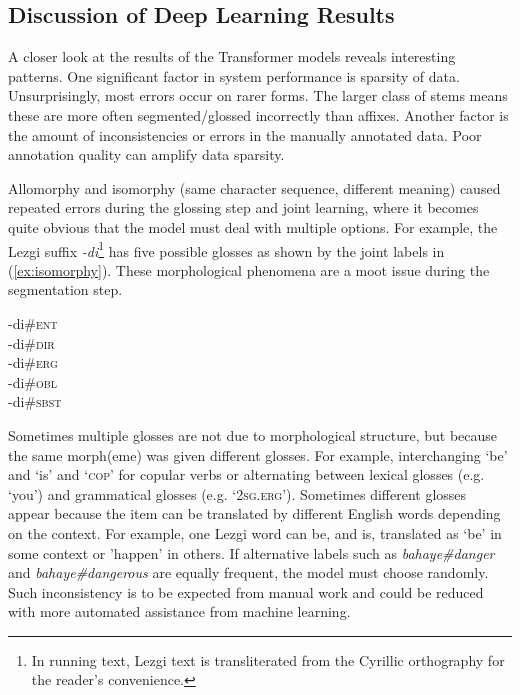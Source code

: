 \subsection{Discussion of Deep Learning Results}
\label{sec:sgDLanalysis}

A closer look at the results of the Transformer models reveals interesting patterns. One significant factor in system performance is sparsity of data. Unsurprisingly, most errors occur on rarer forms. The larger class of stems means these are more often segmented/glossed incorrectly than affixes. Another factor is the amount of inconsistencies or errors in the manually annotated data. Poor annotation quality can amplify data sparsity. 

Allomorphy and isomorphy (same character sequence, different meaning) caused repeated errors during the glossing step and joint learning, where it becomes quite obvious that the model must deal with multiple options. For example, the Lezgi suffix \textit{-di}\footnote{In running text, Lezgi text is transliterated from the Cyrillic orthography for the reader's convenience.} has five possible glosses as shown by the joint labels in (\ref{ex:isomorphy}). These morphological phenomena are a moot issue during the segmentation step. 

\pex   
\label{ex:isomorphy}
-di\#\textsc{ent} \\
-di\#\textsc{dir} \\
-di\#\textsc{erg} \\
-di\#\textsc{obl} \\
-di\#\textsc{sbst} 
\xe

Sometimes multiple glosses are not due to morphological structure, but because the same morph(eme) was given different glosses. For example, interchanging `be' and `is' and `\textsc{cop}' for copular verbs or alternating between lexical glosses (e.g. `you') and grammatical glosses (e.g. `\textsc{2sg.erg}'). Sometimes different glosses appear because the item can be translated by different English words depending on the context. For example, one Lezgi word can be, and is, translated as `be' in some context or 'happen' in others. If alternative labels such as \textit{bahaye\#danger} and \textit{bahaye\#dangerous} are equally frequent, the model must choose randomly. Such inconsistency is to be expected from manual work and could be reduced with more automated assistance from machine learning.

